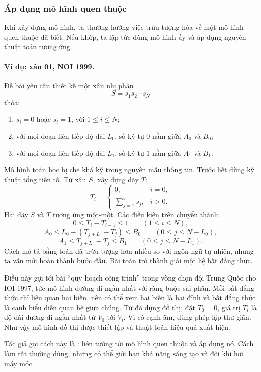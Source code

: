 \documentclass[11pt]{article}
\begin{document}
\subsubsection{Áp dụng mô hình quen thuộc}

Khi xây dựng mô hình, ta thường hướng việc trừu tượng hóa về một mô hình quen
thuộc đã biết. Nếu khớp, ta lập tức dùng mô hình ấy và áp dụng nguyên thuật
toán tương ứng.

\paragraph{Ví dụ: xâu 01, NOI 1999.}
Đề bài yêu cầu thiết kế một xâu nhị phân
\[
  S=s_1s_2\cdots s_N
\]
thỏa:
\begin{enumerate}
  \item \(s_i=0\) hoặc \(s_i=1\), với \(1\le i\le N\);
  \item với mọi đoạn liên tiếp độ dài \(L_0\), số ký tự \(0\) nằm giữa
  \(A_0\) và \(B_0\);
  \item với mọi đoạn liên tiếp độ dài \(L_1\), số ký tự \(1\) nằm giữa
  \(A_1\) và \(B_1\).
\end{enumerate}

Mô hình toán học bị che khá kỹ trong nguyên mẫu thông tin. Trước hết dùng kỹ
thuật tổng tiền tố. Từ xâu \(S\), xây dựng dãy \(T\):
\[
T_i=
\begin{cases}
0, & i=0,\\
\displaystyle\sum_{j=1}^{i}s_j, & i>0.
\end{cases}
\]
Hai dãy \(S\) và \(T\) tương ứng một-một. Các điều kiện trên chuyển thành:
\[
  0\le T_i-T_{i-1}\le 1 \qquad (1\le i\le N),
\]
\[
  A_0\le L_0-(T_{j+L_0}-T_j)\le B_0 \qquad (0\le j\le N-L_0),
\]
\[
  A_1\le T_{j+L_1}-T_j\le B_1 \qquad (0\le j\le N-L_1).
\]
Cách mô tả bằng toán đã trừu tượng hơn nhiều so với ngôn ngữ tự nhiên, nhưng
ta vẫn mới hoàn thành bước đầu. Bài toán trở thành giải một hệ bất đẳng thức.

Điều này gợi tới bài ``quy hoạch công trình'' trong vòng chọn đội Trung Quốc
cho IOI 1997, tức mô hình đường đi ngắn nhất với ràng buộc sai phân. Mỗi bất
đẳng thức chỉ liên quan hai biến, nên có thể xem hai biến là hai đỉnh và bất
đẳng thức là cạnh biểu diễn quan hệ giữa chúng. Từ đó dựng đồ thị; đặt
\(T_0=0\), giá trị \(T_i\) là độ dài đường đi ngắn nhất từ \(V_0\) tới \(V_i\).
Vì có cạnh âm, dùng phép lặp thư giãn. Như vậy mô hình đồ thị được thiết lập
và thuật toán hiệu quả xuất hiện.

Tác giả gọi cách này là : liên tưởng tới mô hình quen
thuộc và áp dụng nó. Cách làm rất thường dùng, nhưng có thể giới hạn khả năng
sáng tạo và đôi khi hơi máy móc.
\end{document}

